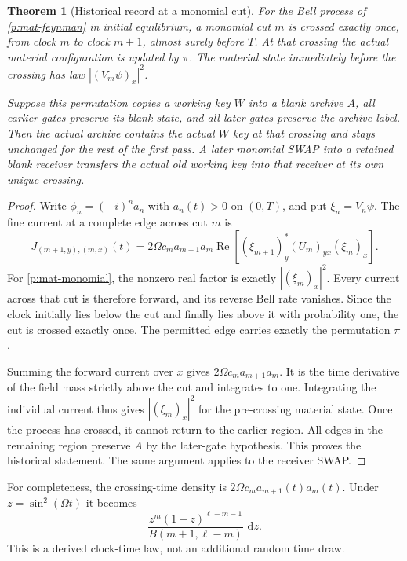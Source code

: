 \documentclass[11pt,oneside,openany]{book}
\newtheorem{theorem}{Theorem}[chapter]
\theoremstyle{definition}
\theoremstyle{remark}\newtheorem{remark}[theorem]{Remark}
\providecommand{\dd}{\,\mathrm d}
\begin{document}
\begin{theorem}[Historical record at a monomial cut]\label{p:monomial}
For the Bell process of \eqref{p:mat-feynman} in initial equilibrium, a
monomial cut $m$ is crossed exactly once, from clock $m$ to clock $m+1$,
almost surely before $T$.  At that crossing the actual material
configuration is updated by $\pi$.  The material state immediately
before the crossing has law $|(V_m\psi)_x|^2$.

Suppose this permutation copies a working key $W$ into a blank archive
$A$, all earlier gates preserve its blank state, and all later gates
preserve the archive label.  Then the actual archive contains the
actual $W$ key at that crossing and stays unchanged for the rest of
the first pass.  A later monomial SWAP into a retained blank receiver
transfers the actual old working key into that receiver at its own
unique crossing.
\end{theorem}
\begin{proof}
Write $\phi_n=(-i)^n a_n$ with $a_n(t)>0$ on $(0,T)$, and put
$\xi_n=V_n\psi$.  The fine current at a complete edge across cut $m$ is
\begin{equation}\label{p:mat-finecurrent}
 J_{(m+1,y),(m,x)}(t)=2\Omega c_ma_{m+1}a_m
   \operatorname{Re}\left[(\xi_{m+1})_y^*(U_m)_{yx}(\xi_m)_x\right].
\end{equation}
For \eqref{p:mat-monomial}, the nonzero real factor is exactly
$|(\xi_m)_x|^2$.  Every current across that cut is therefore forward,
and its reverse Bell rate vanishes.  Since the clock initially lies
below the cut and finally lies above it with probability one, the
cut is crossed exactly once.  The permitted edge carries exactly
the permutation $\pi$.

Summing the forward current over $x$ gives
$2\Omega c_ma_{m+1}a_m$.  It is the time derivative of the field mass
strictly above the cut and integrates to one.  Integrating the
individual current thus gives $|(\xi_m)_x|^2$ for the pre-crossing
material state.  Once the process has crossed, it cannot return to
the earlier region.  All edges in the remaining region preserve $A$
by the later-gate hypothesis.  This proves the historical statement.
The same argument applies to the receiver SWAP.
\end{proof}

For completeness, the crossing-time density is
$2\Omega c_ma_{m+1}(t)a_m(t)$.  Under $z=\sin^2(\Omega t)$ it becomes
\[
 \frac{z^m(1-z)^{\ell-m-1}}{B(m+1,\ell-m)}\,\dd z.
\]
This is a derived clock-time law, not an additional random time draw.
\end{document}
